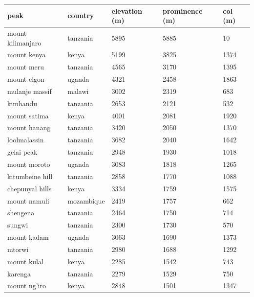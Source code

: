 \documentclass{article}
\begin{document}
\begin{tabular}{lllll}
\toprule
peak & country & elevation (m) & prominence (m) & col (m) \\
\midrule
mount kilimanjaro & tanzania & 5895 & 5885 & 10 \\
mount kenya & kenya & 5199 & 3825 & 1374 \\
mount meru & tanzania & 4565 & 3170 & 1395 \\
mount elgon & uganda & 4321 & 2458 & 1863 \\
mulanje massif & malawi & 3002 & 2319 & 683 \\
kimhandu & tanzania & 2653 & 2121 & 532 \\
mount satima & kenya & 4001 & 2081 & 1920 \\
mount hanang & tanzania & 3420 & 2050 & 1370 \\
loolmalassin & tanzania & 3682 & 2040 & 1642 \\
gelai peak & tanzania & 2948 & 1930 & 1018 \\
mount moroto & uganda & 3083 & 1818 & 1265 \\
kitumbeine hill & tanzania & 2858 & 1770 & 1088 \\
chepunyal hills & kenya & 3334 & 1759 & 1575 \\
mount namuli & mozambique & 2419 & 1757 & 662 \\
shengena & tanzania & 2464 & 1750 & 714 \\
sungwi & tanzania & 2300 & 1730 & 570 \\
mount kadam & uganda & 3063 & 1690 & 1373 \\
mtorwi & tanzania & 2980 & 1688 & 1292 \\
mount kulal & kenya & 2285 & 1542 & 743 \\
karenga & tanzania & 2279 & 1529 & 750 \\
mount ng'iro & kenya & 2848 & 1501 & 1347 \\
\bottomrule
\end{tabular}
\end{document}
